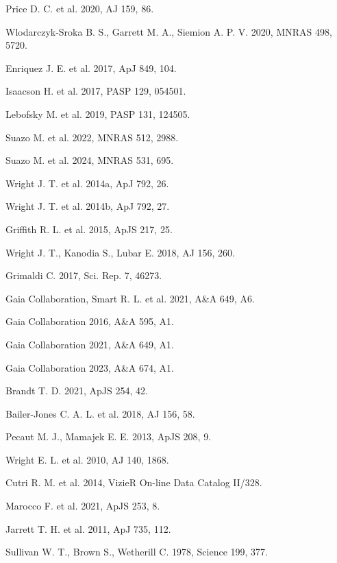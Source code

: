 \documentclass[11pt]{article}
\begin{document}
\noindent [1] Price D. C. et al. 2020, AJ 159, 86.\par\smallskip
\noindent [2] Wlodarczyk-Sroka B. S., Garrett M. A., Siemion A. P. V. 2020, MNRAS 498, 5720.\par\smallskip
\noindent [3] Enriquez J. E. et al. 2017, ApJ 849, 104.\par\smallskip
\noindent [4] Isaacson H. et al. 2017, PASP 129, 054501.\par\smallskip
\noindent [5] Lebofsky M. et al. 2019, PASP 131, 124505.\par\smallskip
\noindent [6] Suazo M. et al. 2022, MNRAS 512, 2988.\par\smallskip
\noindent [7] Suazo M. et al. 2024, MNRAS 531, 695.\par\smallskip
\noindent [8] Wright J. T. et al. 2014a, ApJ 792, 26.\par\smallskip
\noindent [9] Wright J. T. et al. 2014b, ApJ 792, 27.\par\smallskip
\noindent [10] Griffith R. L. et al. 2015, ApJS 217, 25.\par\smallskip
\noindent [11] Wright J. T., Kanodia S., Lubar E. 2018, AJ 156, 260.\par\smallskip
\noindent [12] Grimaldi C. 2017, Sci. Rep. 7, 46273.\par\smallskip
\noindent [13] Gaia Collaboration, Smart R. L. et al. 2021, A\&A 649, A6.\par\smallskip
\noindent [14] Gaia Collaboration 2016, A\&A 595, A1.\par\smallskip
\noindent [15] Gaia Collaboration 2021, A\&A 649, A1.\par\smallskip
\noindent [16] Gaia Collaboration 2023, A\&A 674, A1.\par\smallskip
\noindent [17] Brandt T. D. 2021, ApJS 254, 42.\par\smallskip
\noindent [18] Bailer-Jones C. A. L. et al. 2018, AJ 156, 58.\par\smallskip
\noindent [19] Pecaut M. J., Mamajek E. E. 2013, ApJS 208, 9.\par\smallskip
\noindent [20] Wright E. L. et al. 2010, AJ 140, 1868.\par\smallskip
\noindent [21] Cutri R. M. et al. 2014, VizieR On-line Data Catalog II/328.\par\smallskip
\noindent [22] Marocco F. et al. 2021, ApJS 253, 8.\par\smallskip
\noindent [23] Jarrett T. H. et al. 2011, ApJ 735, 112.\par\smallskip
\noindent [24] Sullivan W. T., Brown S., Wetherill C. 1978, Science 199, 377.\par\smallskip
\end{document}
